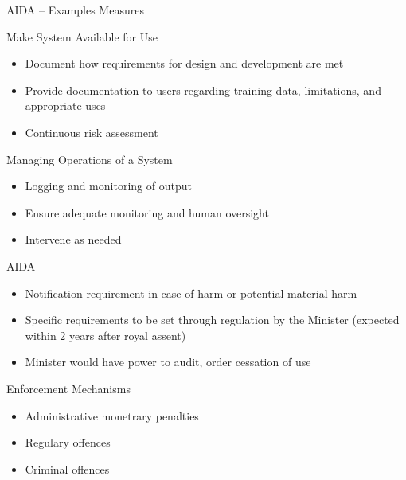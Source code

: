 \documentclass[ignorenonframetext,xcolor=x11names]{beamer}
\begin{document}
\begin{frame}[label=advanced]{AIDA -- Examples Measures}
\begin{block}{Make System Available for Use}
\begin{itemize}
   \item Document how requirements for design and development are met
   \item Provide documentation to users regarding training data, limitations, and appropriate uses
   \item Continuous risk assessment
\end{itemize}
\end{block}

\begin{block}{Managing Operations of a System}
\begin{itemize}
   \item Logging and monitoring of output
   \item Ensure adequate monitoring and human oversight
   \item Intervene as needed
\end{itemize}
\end{block}
\end{frame}

\begin{frame}[label=advanced]{AIDA}
\begin{itemize}
   \item Notification requirement in case of harm or potential material harm
   \item Specific requirements to be set through regulation by the Minister (expected within 2 years after royal assent)
   \item Minister would have power to audit, order cessation of use
\end{itemize}

\begin{block}{Enforcement Mechanisms}
\begin{itemize}
   \item Administrative monetrary penalties
   \item Regulary offences
   \item Criminal offences
\end{itemize}
\end{block}
\end{frame}
\end{document}
